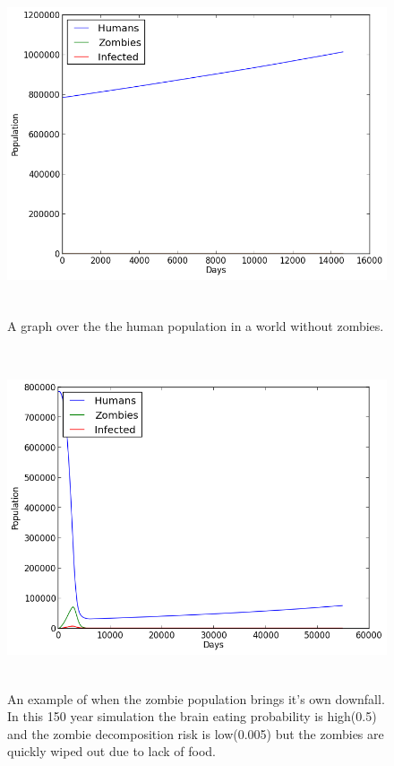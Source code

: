 \documentclass{article}
\begin{document}
\begin{figure}[h!]
\includegraphics[height = 10cm]{plots/withoutzombies}
\caption{A graph over the the human population in a world without zombies.}
\label{withoutzombies}
\end{figure}
\begin{figure}[h!]
\includegraphics[height = 10cm]{plots/zombieswipedout}
\caption{An example of when the zombie population brings it's own downfall. In this 150 year simulation the brain eating probability is high(0.5) and the zombie decomposition risk is low(0.005) but the zombies are quickly wiped out due to lack of food.}
\label{zombieswipedout}
\end{figure}
\end{document}
